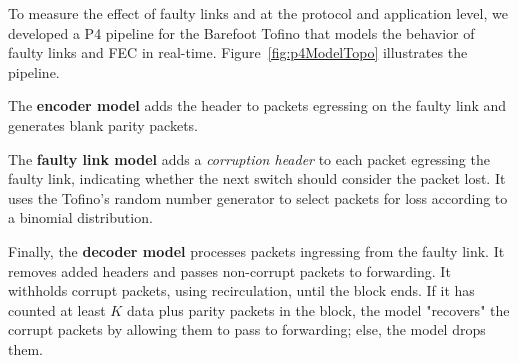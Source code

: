 



To measure the effect of faulty links and \OurSys at the protocol and
application level, we developed a P4 pipeline for the Barefoot Tofino that
models the behavior of faulty links and FEC in real-time.
Figure~\ref{fig:p4ModelTopo} illustrates the pipeline.




The \textbf{encoder model} adds the \OurSys header to packets egressing on
the faulty link and generates blank parity packets. 


The \textbf{faulty link model} adds a \emph{corruption header} to each packet
egressing the faulty link, indicating whether the next switch should
consider the packet lost. It uses the Tofino's  random number generator to
select packets for loss according to a binomial  distribution.


Finally, the \textbf{decoder model} processes packets ingressing from the
faulty link. It removes added headers and passes non-corrupt packets to
forwarding. It withholds corrupt packets, using recirculation, until the block
ends. If it has counted at least $K$ data plus parity packets in the block,
the model "recovers" the corrupt packets by allowing them to pass to
forwarding; else, the model drops them.

